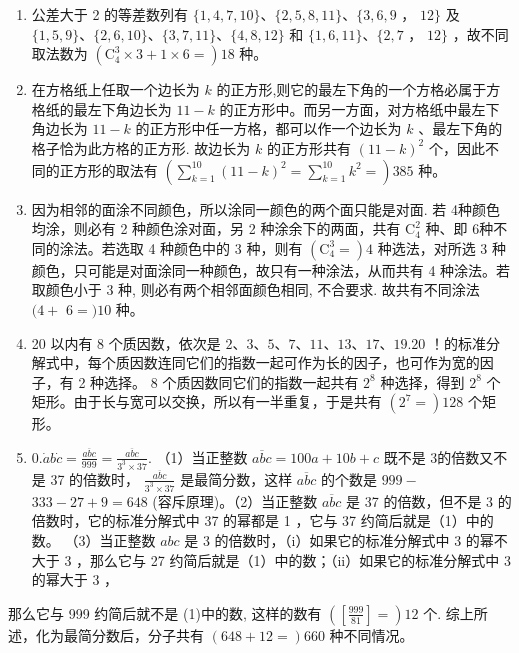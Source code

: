 \documentclass[10pt]{article}
\begin{document}
\begin{enumerate}
  \item 公差大于 2 的等差数列有 $\{1,4,7,10\} 、\{2,5,8,11\} 、\{3,6,9$ ， $12\}$ 及 $\{1,5,9\} 、\{2,6,10\} 、\{3,7,11\} 、\{4,8,12\}$ 和 $\{1,6,11\} 、\{2,7$ ， $12\}$ ，故不同取法数为 $\left(\mathrm{C}_{4}^{3} \times 3+1 \times 6=\right) 18$ 种。
  \item 在方格纸上任取一个边长为 $k$ 的正方形,则它的最左下角的一个方格必属于方格纸的最左下角边长为 $11-k$ 的正方形中。而另一方面，对方格纸中最左下角边长为 $11-k$ 的正方形中任一方格，都可以作一个边长为 $k$ 、最左下角的格子恰为此方格的正方形. 故边长为 $k$ 的正方形共有 $(11-k)^{2}$ 个，因此不同的正方形的取法有 $\left(\sum_{k=1}^{10}(11-k)^{2}=\sum_{k=1}^{10} k^{2}=\right) 385$ 种。
  \item 因为相邻的面涂不同颜色，所以涂同一颜色的两个面只能是对面. 若 4种颜色均涂，则必有 2 种颜色涂对面，另 2 种涂余下的两面，共有 $\mathrm{C}_{4}^{2}$ 种、即 6种不同的涂法。若选取 4 种颜色中的 3 种，则有 $\left(\mathrm{C}_{4}^{3}=\right) 4$ 种选法，对所选 3 种颜色，只可能是对面涂同一种颜色，故只有一种涂法，从而共有 4 种涂法。若取颜色小于 3 种, 则必有两个相邻面颜色相同, 不合要求. 故共有不同涂法 $(4+$ $6=) 10$ 种。
  \item 20 以内有 8 个质因数，依次是 $2 、 3 、 5 、 7 、 11 、 13 、 17 、 19.20$ ！的标准分解式中，每个质因数连同它们的指数一起可作为长的因子，也可作为宽的因子，有 2 种选择。 8 个质因数同它们的指数一起共有 $2^{8}$ 种选择，得到 $2^{8}$ 个矩形。由于长与宽可以交换，所以有一半重复，于是共有 $\left(2^{7}=\right) 128$ 个矩形。
  \item $0 . \dot{a} b \dot{c}=\frac{\overline{a b c}}{999}=\frac{\overline{a b c}}{3^{3} \times 37}$. （1）当正整数 $\overline{a b c}=100 a+10 b+c$ 既不是 3的倍数又不是 37 的倍数时， $\frac{\overline{a b c}}{3^{3} \times 37}$ 是最简分数，这样 $\overline{a b c}$ 的个数是 $999-$ $333-27+9=648$ (容斥原理)。（2）当正整数 $\overline{a b c}$ 是 37 的倍数，但不是 3 的倍数时，它的标准分解式中 37 的幂都是 1 ，它与 37 约简后就是（1）中的数。 （3）当正整数 $a b c$ 是 3 的倍数时，（i）如果它的标准分解式中 3 的幂不大于 3 ，那么它与 27 约简后就是（1）中的数；（ii）如果它的标准分解式中 3 的幂大于 3 ，
\end{enumerate}

那么它与 999 约简后就不是 (1)中的数, 这样的数有 $\left(\left[\frac{999}{81}\right]=\right) 12$ 个. 综上所述，化为最简分数后，分子共有 $(648+12=) 660$ 种不同情况。
\end{document}
